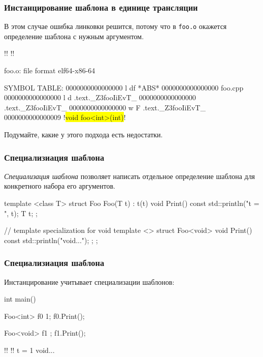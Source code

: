 \documentclass[compress, 8pt, aspectratio=169]{beamer}
\begin{document}
  \begin{frame}[fragile]

    \frametitle{Инстанцирование шаблона в единице трансляции}

    В этом случае ошибка линковки решится, потому что в \verb|foo.o|
    окажется определение шаблона с нужным аргументом.

    \begin{terminalwindow}
!!
!!

foo.o:     file format elf64-x86-64

SYMBOL TABLE:
0000000000000000 l    df *ABS*  0000000000000000 foo.cpp
0000000000000000 l    d  .text._Z3fooIiEvT_     0000000000000000 .text._Z3fooIiEvT_
0000000000000000  w    F .text._Z3fooIiEvT_     0000000000000009 !\colorbox{yellow}{void foo<int>(int)}!
    \end{terminalwindow}

    \begin{task}
      Подумайте, какие у этого подхода есть недостатки.
    \end{task}

  \end{frame}

  \begin{frame}[fragile]

    \frametitle{Специализиация шаблона}

    \textit{Специализация шаблона}\footnotemark{}
    позволяет написать отдельное определение
    шаблона для конкретного набора его аргументов.


    \begin{myinplacelisting}[minted language=cpp]
template <class T>
struct Foo {
    Foo(T t) : t(t) {}
    void Print() const {
        std::println("t = {}", t);
    }
    T t;
};

// template specialization for void
template <>
struct Foo<void> {
    void Print() const {
        std::println("void...");
    };
};
    \end{myinplacelisting}

  \end{frame}

  \begin{frame}[fragile]

    \frametitle{Специализиация шаблона}

    Инстанцирование учитывает специализации шаблонов:

    \begin{myinplacelisting}[minted language=cpp]
int main() {
    Foo<int> f0 {1};
    f0.Print();

    Foo<void> f1 {};
    f1.Print();
}
    \end{myinplacelisting}

    \begin{terminalwindow}
!!
!!
t = 1
void...
    \end{terminalwindow}

  \end{frame}
\end{document}
